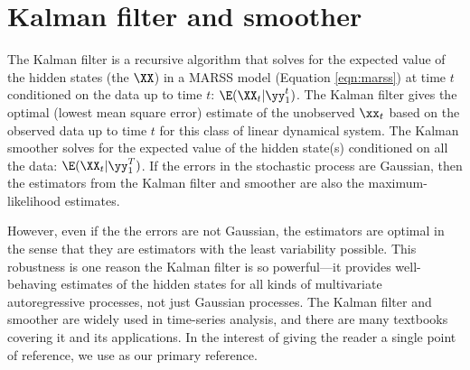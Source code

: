 \section{Kalman filter and smoother}\label{sec:kalmanfilter}

The Kalman filter \citep{Kalman1960} is a recursive algorithm that solves for the expected value of the hidden states (the $\XX$) in a MARSS model (Equation \ref{eqn:marss}) at time $t$ conditioned on the data up to time $t$: $\E(\XX_t|\yy_1^t)$.  The Kalman filter gives the optimal (lowest mean square error) estimate of the unobserved $\xx_t$ based on the observed data up to time $t$ for this class of linear dynamical system.  The Kalman smoother \citep{Rauchetal1965} solves for the expected value of the hidden state(s) conditioned on all the data: $\E(\XX_t|\yy_1^T)$.  If the errors in the stochastic process are Gaussian, then the estimators from the Kalman filter and smoother are also the maximum-likelihood estimates.  

However, even if the the errors are not Gaussian, the estimators are optimal in the sense that they are estimators with the least variability possible.  This robustness is one reason the Kalman filter is so powerful---it provides well-behaving estimates of the hidden states for all kinds of multivariate autoregressive processes, not just Gaussian processes.  The Kalman filter and smoother are widely used in time-series analysis, and there are many textbooks covering it and its applications.  In the interest of giving the reader a single point of reference, we use \citet{ShumwayStoffer2006} as our primary reference.  

